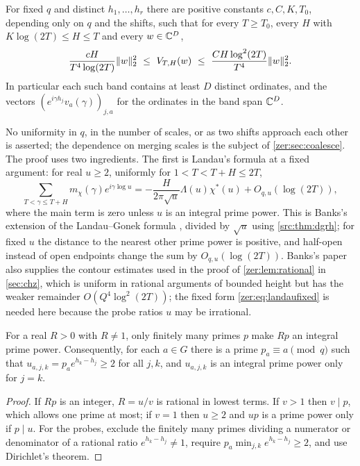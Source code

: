 \begin{theorem}\label{zer:thm:coercive}
For fixed $q$ and distinct $h_1,\dots,h_r$ there are positive constants $c,C,K,T_0$,
depending only on $q$ and the shifts, such that for every $T\ge T_0$, every $H$ with
$K\log(2T)\le H\le T$ and every $w\in\mathbb{C}^D$,
\begin{equation}\label{zer:eq:coercive}
 \frac{cH}{T^4\log(2T)}\norm w_2^2\ \le\ V_{T,H}(w)\ \le\ \frac{CH\log^2(2T)}{T^4}\norm w_2^2 .
\end{equation}
In particular each such band contains at least $D$ distinct ordinates, and the vectors
$(e^{i\gamma h_j}v_a(\gamma))_{j,a}$ for the ordinates in the band span $\mathbb{C}^D$.
\end{theorem}

No uniformity in $q$, in the number of scales, or as two shifts approach each other is
asserted; the dependence on merging scales is the subject of \cref{zer:sec:coalesce}. The proof
uses two ingredients. The first is Landau's formula at a fixed argument: for real $u\ge2$,
uniformly for $1<T<T+H\le2T$,
\begin{equation}\label{zer:eq:landaufixed}
 \sum_{T<\gamma\le T+H}m_\chi(\gamma)e^{i\gamma\log u}
 =-\frac{H}{2\pi\sqrt u}\Lambda(u)\chi^*(u)+O_{q,u}(\log(2T)),
\end{equation}
where the main term is zero unless $u$ is an integral prime power. This is Banks's extension of
the Landau--Gonek formula \cite[Theorem~1.2]{Banks2023Comparing}, divided by $\sqrt u$ using
\cref{src:thm:dgrh}; for fixed $u$ the distance to the nearest other prime power is positive,
and half-open instead of open endpoints change the sum by $O_{q,u}(\log(2T))$. Banks's paper
also supplies the contour estimates used in the proof of \cref{zer:lem:rational} in \cref{sec:chz}, which is uniform
in rational arguments of bounded height but has the weaker remainder $O(Q^4\log^2(2T))$; the fixed
form \eqref{zer:eq:landaufixed} is needed here because the probe ratios $u$ may be irrational.

\begin{lemma}\label{zer:lem:probes}
For a real $R>0$ with $R\ne1$, only finitely many primes $p$ make $Rp$ an integral prime power.
Consequently, for each $a\in G$ there is a prime $p_a\equiv a\pmod q$ such that
$u_{a,j,k}=p_ae^{h_k-h_j}\ge2$ for all $j,k$, and $u_{a,j,k}$ is an integral prime power only for
$j=k$.
\end{lemma}
\begin{proof}
If $Rp$ is an integer, $R=u/v$ is rational in lowest terms. If $v>1$ then $v\mid p$, which
allows one prime at most; if $v=1$ then $u\ge2$ and $up$ is a prime power only if $p\mid u$.
For the probes, exclude the finitely many primes dividing a numerator or denominator of a
rational ratio $e^{h_k-h_j}\ne1$, require $p_a\min_{j,k}e^{h_k-h_j}\ge2$, and use Dirichlet's
theorem.
\end{proof}

